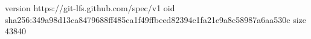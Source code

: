 version https://git-lfs.github.com/spec/v1
oid sha256:349a98d13ca8479688ff485ca1f49ffbeed82394c1fa21e9a8c58987a6aa530c
size 43840
